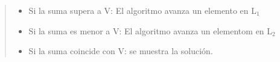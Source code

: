 \documentclass[8pt,a4paper]{article}
\begin{document}
\begin{verse}
	\begin{itemize}
	\item Si la suma supera a V: El algoritmo avanza un elemento en L$_{1}$
	\item Si la suma es menor a V: El algoritmo avanza un elementom en L$_{2}$
	\item Si la suma coincide con V: se muestra la solución.
	\end{itemize}
	
	

\end{verse}
\end{document}
